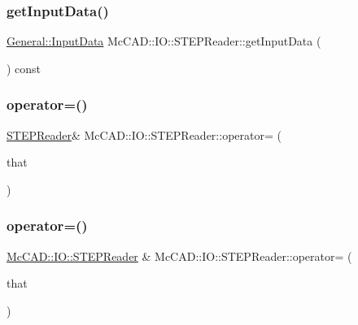 \subsubsection{\texorpdfstring{get\+Input\+Data()}{getInputData()}\hspace{0.1cm}{\footnotesize\ttfamily [2/2]}}
{\footnotesize\ttfamily \hyperlink{classMcCAD_1_1General_1_1InputData}{General\+::\+Input\+Data} Mc\+C\+A\+D\+::\+I\+O\+::\+S\+T\+E\+P\+Reader\+::get\+Input\+Data (\begin{DoxyParamCaption}{ }\end{DoxyParamCaption}) const}

\mbox{\label{classMcCAD_1_1IO_1_1STEPReader_a76364e997a7f0dfaaede72feeb358485}} 
\subsubsection{\texorpdfstring{operator=()}{operator=()}\hspace{0.1cm}{\footnotesize\ttfamily [1/4]}}
{\footnotesize\ttfamily \hyperlink{classMcCAD_1_1IO_1_1STEPReader}{S\+T\+E\+P\+Reader}\& Mc\+C\+A\+D\+::\+I\+O\+::\+S\+T\+E\+P\+Reader\+::operator= (\begin{DoxyParamCaption}\item[{const \hyperlink{classMcCAD_1_1IO_1_1STEPReader}{S\+T\+E\+P\+Reader} \&}]{that }\end{DoxyParamCaption})}

\mbox{\label{classMcCAD_1_1IO_1_1STEPReader_a6ebf3c62dbea5fe58ca4f9808c9d35a1}} 
\subsubsection{\texorpdfstring{operator=()}{operator=()}\hspace{0.1cm}{\footnotesize\ttfamily [2/4]}}
{\footnotesize\ttfamily \hyperlink{classMcCAD_1_1IO_1_1STEPReader}{Mc\+C\+A\+D\+::\+I\+O\+::\+S\+T\+E\+P\+Reader} \& Mc\+C\+A\+D\+::\+I\+O\+::\+S\+T\+E\+P\+Reader\+::operator= (\begin{DoxyParamCaption}\item[{const \hyperlink{classMcCAD_1_1IO_1_1STEPReader}{S\+T\+E\+P\+Reader} \&}]{that }\end{DoxyParamCaption})}



